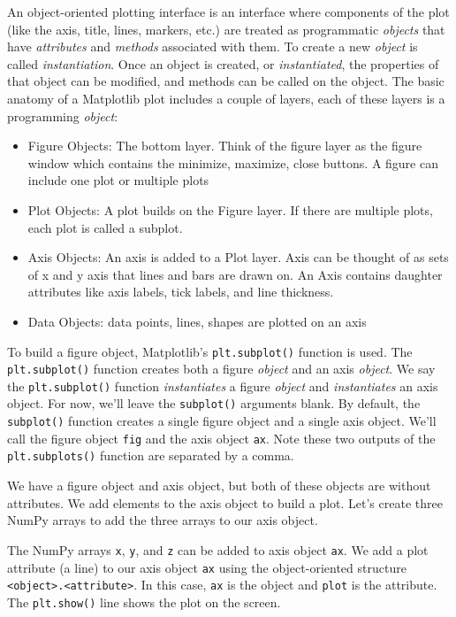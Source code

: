 \documentclass{book}
\providecommand{\tightlist}{%
      \setlength{\itemsep}{0pt}\setlength{\parskip}{0pt}}
\begin{document}
An object-oriented plotting interface is an interface where components
of the plot (like the axis, title, lines, markers, etc.) are treated as
programmatic \emph{objects} that have \emph{attributes} and
\emph{methods} associated with them. To create a new \emph{object} is
called \emph{instantiation}. Once an object is created, or
\emph{instantiated}, the properties of that object can be modified, and
methods can be called on the object. The basic anatomy of a Matplotlib
plot includes a couple of layers, each of these layers is a programming
\emph{object}:

\begin{itemize}
\tightlist
\item
  Figure Objects: The bottom layer. Think of the figure layer as the
  figure window which contains the minimize, maximize, close buttons. A
  figure can include one plot or multiple plots
\item
  Plot Objects: A plot builds on the Figure layer. If there are multiple
  plots, each plot is called a subplot.
\item
  Axis Objects: An axis is added to a Plot layer. Axis can be thought of
  as sets of x and y axis that lines and bars are drawn on. An Axis
  contains daughter attributes like axis labels, tick labels, and line
  thickness.
\item
  Data Objects: data points, lines, shapes are plotted on an axis
\end{itemize}

To build a figure object, Matplotlib's \lstinline!plt.subplot()!
function is used. The \lstinline!plt.subplot()! function creates both a
figure \emph{object} and an axis \emph{object}. We say the
\lstinline!plt.subplot()! function \emph{instantiates} a figure
\emph{object} and \emph{instantiates} an axis object. For now, we'll
leave the \lstinline!subplot()! arguments blank. By default, the
\lstinline!subplot()! function creates a single figure object and a
single axis object. We'll call the figure object \lstinline!fig! and the
axis object \lstinline!ax!. Note these two outputs of the
\lstinline!plt.subplots()! function are separated by a comma.

We have a figure object and axis object, but both of these objects are
without attributes. We add elements to the axis object to build a plot.
Let's create three NumPy arrays to add the three arrays to our axis
object.

The NumPy arrays \lstinline!x!, \lstinline!y!, and \lstinline!z! can be
added to axis object \lstinline!ax!. We add a plot attribute (a line) to
our axis object \lstinline!ax! using the object-oriented structure
\lstinline!<object>.<attribute>!. In this case, \lstinline!ax! is the
object and \lstinline!plot! is the attribute. The \lstinline!plt.show()!
line shows the plot on the screen.
\end{document}
